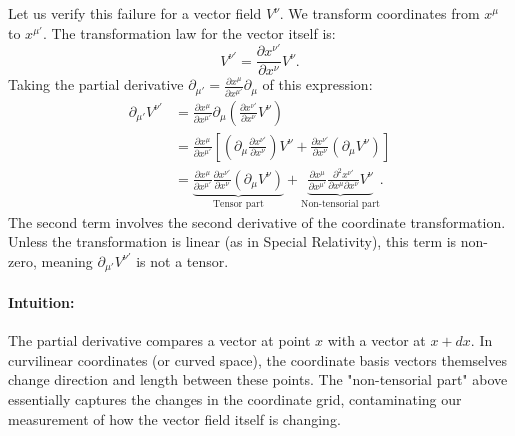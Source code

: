 \documentclass[11pt, a4paper]{report}
\begin{document}
Let us verify this failure for a vector field \(V^\nu\). We transform coordinates from \(x^\mu\) to \(x^{\mu'}\). The transformation law for the vector itself is:
\begin{equation}
V^{\nu'} = \frac{\partial x^{\nu'}}{\partial x^\nu} V^\nu.
\end{equation}
Taking the partial derivative \(\partial_{\mu'} = \frac{\partial x^\mu}{\partial x^{\mu'}} \partial_\mu\) of this expression:
\begin{align}
\partial_{\mu'} V^{\nu'} &= \frac{\partial x^\mu}{\partial x^{\mu'}} \partial_\mu \left( \frac{\partial x^{\nu'}}{\partial x^\nu} V^\nu \right) \\
&= \frac{\partial x^\mu}{\partial x^{\mu'}} \left[ \left( \partial_\mu \frac{\partial x^{\nu'}}{\partial x^\nu} \right) V^\nu + \frac{\partial x^{\nu'}}{\partial x^\nu} (\partial_\mu V^\nu) \right] \\
&= \underbrace{\frac{\partial x^\mu}{\partial x^{\mu'}} \frac{\partial x^{\nu'}}{\partial x^\nu} (\partial_\mu V^\nu)}_{\text{Tensor part}} + \underbrace{\frac{\partial x^\mu}{\partial x^{\mu'}} \frac{\partial^2 x^{\nu'}}{\partial x^\mu \partial x^\nu} V^\nu}_{\text{Non-tensorial part}}.
\end{align}
The second term involves the second derivative of the coordinate transformation. Unless the transformation is linear (as in Special Relativity), this term is non-zero, meaning \(\partial_{\mu'} V^{\nu'}\) is not a tensor.

\paragraph{Intuition:} The partial derivative compares a vector at point \(x\) with a vector at \(x + dx\). In curvilinear coordinates (or curved space), the coordinate basis vectors themselves change direction and length between these points. The "non-tensorial part" above essentially captures the changes in the coordinate grid, contaminating our measurement of how the vector field itself is changing.
\end{document}
